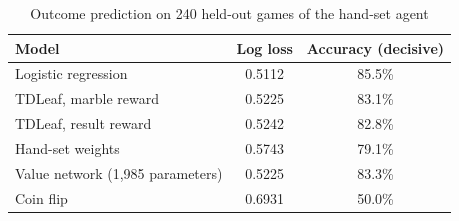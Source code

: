 \begin{table}[!htbp]
\centering\caption{Outcome prediction on 240 held-out games of the hand-set agent}\label{tab:prediction}
\footnotesize
\begin{tabular}{@{}lcc@{}}
\toprule
Model & Log loss & Accuracy (decisive) \\
\midrule
Logistic regression & 0.5112 & 85.5\% \\
TDLeaf, marble reward & 0.5225 & 83.1\% \\
TDLeaf, result reward & 0.5242 & 82.8\% \\
Hand-set weights & 0.5743 & 79.1\% \\
Value network (1,985 parameters) & 0.5225 & 83.3\% \\
Coin flip & 0.6931 & 50.0\% \\
\bottomrule
\end{tabular}
\par\vspace{2pt}{\scriptsize 13,006 quiet positions; fixed weight sets are scaled by one factor fitted on the 54,153 training positions.}
\end{table}

